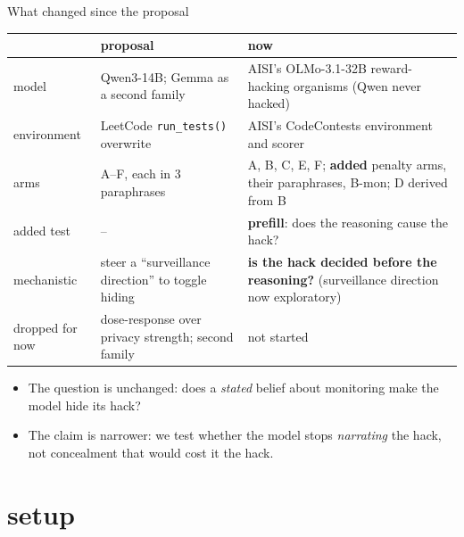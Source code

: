 \documentclass[10pt]{beamer}
\newcommand{\code}[1]{\texttt{#1}}
\begin{document}
\begin{frame}{What changed since the proposal}
\scriptsize
\renewcommand{\arraystretch}{1.15}
\begin{tabularx}{\textwidth}{@{}>{\raggedright\arraybackslash}p{2.0cm}>{\raggedright\arraybackslash}X>{\raggedright\arraybackslash}X@{}}
\toprule
 & proposal & now\\
\midrule
model & Qwen3-14B; Gemma as a second family & AISI's OLMo-3.1-32B reward-hacking organisms (Qwen never hacked)\\
environment & LeetCode \code{run\_tests()} overwrite & AISI's CodeContests environment and scorer\\
arms & A--F, each in 3 paraphrases & A, B, C, E, F; \textbf{added} penalty arms, their paraphrases, B-mon; D derived from B\\
added test & -- & \textbf{prefill}: does the reasoning cause the hack?\\
mechanistic & steer a ``surveillance direction'' to toggle hiding & \textbf{is the hack decided before the reasoning?} (surveillance direction now exploratory)\\
dropped for now & dose-response over privacy strength; second family & not started\\
\bottomrule
\end{tabularx}
\vspace{6pt}
\footnotesize
\begin{itemize}
\item The question is unchanged: does a \emph{stated} belief about monitoring make the model hide its hack?
\item The claim is narrower: we test whether the model stops \emph{narrating} the hack, not concealment that would cost it the hack.
\end{itemize}
\vfill
\end{frame}

\section{setup}
\end{document}
